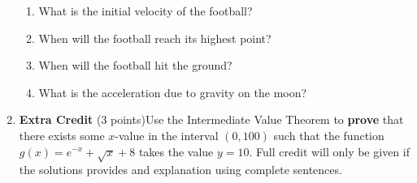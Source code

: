 \documentclass[12pt]{article}
\begin{document}
\begin{enumerate}
	\begin{enumerate}

	\item What is the initial velocity of the football?\\ \vfill

	\item When will the football reach its highest point?\\ \vfill


	\item When will the football hit the ground?\\ \vfill

	\item What is the acceleration due to gravity on the moon?\\ \vfill

\end{enumerate}
\newpage
\item \textbf{Extra Credit} (3 points)Use the Intermediate Value Theorem to \textbf{prove} that there exists some
$x$-value in the interval $(0,100)$ such that the function $g(x)=e^{-x}+\sqrt{x}+8$ takes the value $y=10.$ Full credit will only be given if the solutions provides and explanation using complete sentences.

\end{enumerate}
\end{document}
